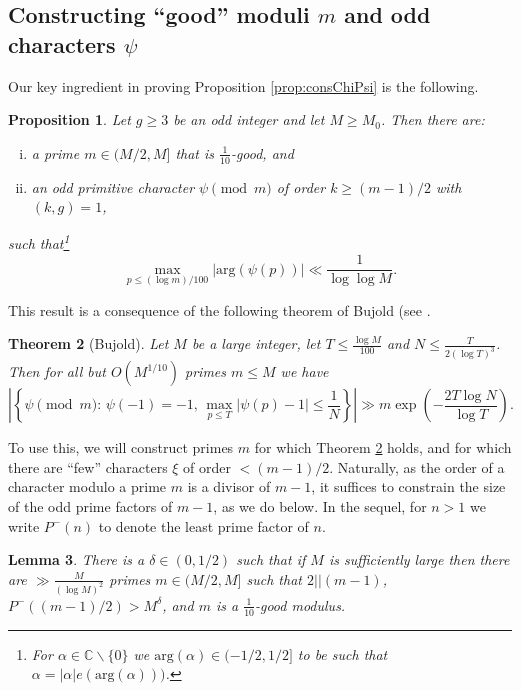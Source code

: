 \documentclass[10pt]{amsart}
\newtheorem{thm}{Theorem}[section]
\newtheorem{prop}[thm]{Proposition}
\newtheorem{lem}[thm]{Lemma}
\theoremstyle{definition}
\newcommand{\bk}{\backslash}
\newcommand{\mb}{\mathbb}
\begin{document}
\subsection{Constructing ``good'' moduli $m$ and odd characters $\psi$} \label{subsec:BujApp}
Our key ingredient in proving Proposition \ref{prop:consChiPsi} is the following. \begin{prop} \label{prop:consChar}
Let $g\geq 3$ be an odd integer and let $M \geq M_0$. Then there are: 
\begin{enumerate}[(i)]
\item a prime $m \in (M/2,M]$ that is $\tfrac{1}{10}$-good, and 
\item an odd primitive character $\psi \pmod{m}$ of order $k \geq (m-1)/2$ with $(k,g) = 1$, 
\end{enumerate}
such that\footnote{For $\alpha \in \mb{C} \bk \{0\}$ we $\text{arg}(\alpha) \in (-1/2,1/2]$ to be such that $\alpha = |\alpha|e(\text{arg}(\alpha)))$.}
$$
\max_{p \leq (\log m)/100} |\text{arg}(\psi(p))| \ll \frac{1}{\log \log M}.
$$
\end{prop}
This result is a consequence of the following theorem of Bujold (see \cite[Prop. 4.5]{Buj}. 
\begin{thm}[Bujold] \label{thm:Buj}
Let $M$ be a large integer, let $T \leq \frac{\log M}{100}$ and $N \leq \frac{T}{2(\log T)^3}$. Then for all but $O(M^{1/10})$ primes $m \leq M$ we have
$$
\left|\left\{\psi \pmod{m} : \,  \psi(-1) = -1, \, \max_{p \leq T} |\psi(p)-1| \leq \frac{1}{N}\right\}\right| \gg m \exp\left(-\frac{2T \log N}{\log T}\right).
$$
\end{thm}
To use this, we will construct primes $m$ for which Theorem \ref{thm:Buj} holds, and for which there are ``few'' characters $\xi$ of order $<(m-1)/2$. Naturally, as the order of a character modulo a prime $m$ is a divisor of $m-1$, it suffices to constrain the size of the odd prime factors of $m-1$, as we do below. In the sequel, for $n > 1$ we write $P^-(n)$ to denote the least prime factor of $n$.
\begin{lem} \label{lem:siftShift}
There is a $\delta \in (0,1/2)$ such that if $M$ is sufficiently large then there are $\gg\frac{M}{(\log M)^2}$ primes $m \in (M/2,M]$ such that $2||(m-1)$, $P^-((m-1)/2) > M^\delta$, and $m$ is a $\tfrac{1}{10}$-good modulus.
\end{lem}
\end{document}

